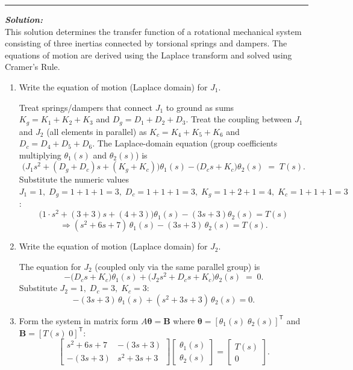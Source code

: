 \documentclass[11pt]{article}
\begin{document}
\noindent\rule{\textwidth}{1pt}

\vspace{12pt}

\noindent \textbf{\textit{Solution:}}
\\ This solution determines the transfer function of a rotational mechanical system consisting of three inertias connected by torsional springs and dampers. The equations of motion are derived using the Laplace transform and solved using Cramer's Rule.\\

\begin{enumerate}[label=(\alph*), itemindent=*, leftmargin=*, nolistsep]
     \item Write the equation of motion (Laplace domain) for \(J_1\).

    Treat springs/dampers that connect \(J_1\) to ground as sums \(K_g=K_1+K_2+K_3\) and \(D_g=D_1+D_2+D_3\). Treat the coupling between \(J_1\) and \(J_2\) (all elements in parallel) as \(K_c=K_4+K_5+K_6\) and \(D_c=D_4+D_5+D_6\). The Laplace-domain equation (group coefficients multiplying \(\theta_1(s)\) and \(\theta_2(s)\)) is
    \[
    \big(J_1 s^2 + (D_g + D_c)s + (K_g + K_c)\big)\theta_1(s)
    -\big(D_c s + K_c\big)\theta_2(s) \;=\; T(s).
    \]
    Substitute the numeric values
    \(J_1=1,\; D_g=1+1+1=3,\; D_c=1+1+1=3,\; K_g=1+2+1=4,\; K_c=1+1+1=3\):
    \[
    \big(1\cdot s^2 + (3+3)s + (4+3)\big)\theta_1(s) - (3s+3)\theta_2(s) = T(s)
    \]
    \[
    \Rightarrow (s^2 + 6s + 7)\,\theta_1(s) - (3s + 3)\,\theta_2(s) = T(s).
    \]

    \item Write the equation of motion (Laplace domain) for \(J_2\).

    The equation for \(J_2\) (coupled only via the same parallel group) is
    \[
    -\big(D_c s + K_c\big)\theta_1(s)
    +\big(J_2 s^2 + D_c s + K_c\big)\theta_2(s) \;=\; 0.
    \]
    Substitute \(J_2=1,\;D_c=3,\;K_c=3\):
    \[
    -(3s+3)\,\theta_1(s) + (s^2 + 3s + 3)\,\theta_2(s) = 0.
    \]

    \item Form the system in matrix form \(A\boldsymbol{\theta}=\boldsymbol{B}\) where \(\boldsymbol{\theta}=[\theta_1(s)\;\theta_2(s)]^\mathsf{T}\) and \(\boldsymbol{B}=[T(s)\;0]^\mathsf{T}\):
    \[
    \begin{bmatrix}
    s^2 + 6s + 7 & -(3s+3) \\
    -(3s+3) & s^2 + 3s + 3
    \end{bmatrix}
    \begin{bmatrix}
    \theta_1(s) \\[4pt] \theta_2(s)
    \end{bmatrix}
    =
    \begin{bmatrix}
    T(s) \\[4pt] 0
    \end{bmatrix}.
    \]


\end{enumerate}
\end{document}
